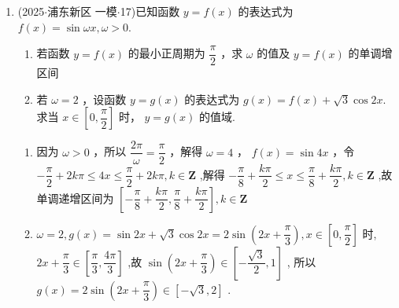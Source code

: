 \begin{enumerate}
\begin{jieda}
\begin{enumerate}
            \item 因为 $\alpha  \in  \left( {\dfrac{\pi }{2},\pi }\right)$ ，所以 ${4\alpha } + \dfrac{\pi }{4} \in  \left( {\dfrac{9\pi }{4},\dfrac{17\pi }{4}}\right)$ . 因为 $f\left( \alpha \right)  =  \dfrac{\sqrt{2}}{2}$ ,所以 $f\left( \alpha \right)  = \dfrac{\sqrt{2}}{2}\sin \left( {{4\alpha } + \dfrac{\pi }{4}}\right)  = \dfrac{\sqrt{2}}{2}$ ,即 $\sin \left( {{4\alpha } + \dfrac{\pi }{4}}\right)  = 1$ . 所以 ${4\alpha } + \dfrac{\pi }{4} = \dfrac{5\pi }{2}$ ,故 $\alpha  = \dfrac{9\pi }{16}$ .
        \end{enumerate}
    \end{jieda}
    \item (2025$\cdot$浦东新区 一模$\cdot$17)已知函数 $y = f\left( x\right)$ 的表达式为 $f\left( x\right)  = \sin {\omega x},\omega  > 0$.
    \begin{enumerate}
        \item 若函数 $y = f\left( x\right)$ 的最小正周期为 $\dfrac{\pi }{2}$ ，求 $\omega$ 的值及 $y = f\left( x\right)$ 的单调增区间
        \item 若 $\omega  = 2$ ，设函数 $y = g\left( x\right)$ 的表达式为 $g\left( x\right)  = f\left( x\right)  + \sqrt{3}\cos {2x}$. 求当 $x \in  \left\lbrack  {0,\dfrac{\pi }{2}}\right\rbrack$ 时， $y =  g\left( x\right)$ 的值域.
    \end{enumerate}
    \begin{jieda}
        \begin{enumerate}
            \item 因为 $\omega  > 0$ ，所以 $\dfrac{2\pi }{\omega } = \dfrac{\pi }{2}$ ，解得 $\omega  = 4$ ， $f\left( x\right)  = \sin {4x}$ ，令 $- \dfrac{\pi }{2} + {2k\pi } \leq  {4x} \leq  \dfrac{\pi }{2} + {2k\pi },k \in  \mathbf{Z}$ ,解得 $- \dfrac{\pi }{8} + \dfrac{k\pi }{2} \leq  x \leq  \dfrac{\pi }{8} +  \dfrac{k\pi }{2},k \in  \mathbf{Z}$ ,故单调递增区间为 $\left\lbrack  {-\dfrac{\pi }{8} + \dfrac{k\pi }{2},\dfrac{\pi }{8} + \dfrac{k\pi }{2}}\right\rbrack  ,k \in  \mathbf{Z}$
            \item $\omega  = 2,g\left( x\right)  = \sin {2x} + \sqrt{3}\cos {2x} = 2\sin \left( {{2x} + \dfrac{\pi }{3}}\right) ,x \in  \left\lbrack  {0,\dfrac{\pi }{2}}\right\rbrack$ 时, ${2x} + \dfrac{\pi }{3} \in  \left\lbrack  {\dfrac{\pi }{3},\dfrac{4\pi }{3}}\right\rbrack$ ,故 $\sin \left( {{2x} + \dfrac{\pi }{3}}\right)  \in  \left\lbrack  {-\dfrac{\sqrt{3}}{2},1}\right\rbrack$ , 所以 $g\left( x\right)  = 2\sin \left( {{2x} + \dfrac{\pi }{3}}\right)  \in  \left\lbrack  {-\sqrt{3},2}\right\rbrack$ .

\end{enumerate}
\end{jieda}
\end{enumerate}
